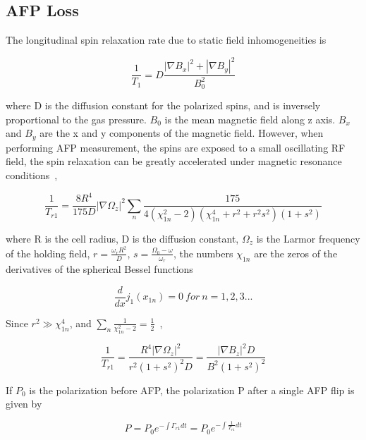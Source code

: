 \subsection{AFP Loss}

The longitudinal spin relaxation rate due to static field inhomogeneities is

\begin{equation}
\frac{1}{T_{1}} = D\frac{|\nabla B_{x}|^{2}+|\nabla B_{y}|^{2}}{B_{0}^{2}}
\end{equation}

where D is the diffusion constant for the polarized spins, and is inversely proportional to the gas pressure. $B_{0}$ is the mean magnetic field along z axis. $B_{x}$ and $B_{y}$ are the x and y components of the magnetic field. However, when performing AFP measurement, the spins are exposed to a small oscillating RF field, the spin relaxation can be greatly accelerated under magnetic resonance conditions~\cite{PhysRevA.38.5092},

\begin{equation}
\frac{1}{T_{r1}} = \frac{8R^{4}}{175D}|\nabla \Omega_{z}|^{2}\sum_{n} \frac{175}{4(\chi_{1n}^{2}-2)(\chi_{1n}^{4}+r^{2}+r^{2}s^{2})(1+s^{2})}
\end{equation}

where R is the cell radius, D is the diffusion constant, $\Omega_{z}$ is the Larmor frequency of the holding field, $r=\frac{\omega_{r}R^{2}}{D}$, $s=\frac{\Omega_{0}-\omega}{\omega_{r}}$, the numbers $\chi_{1n}$ are the zeros of the derivatives of the spherical Bessel functions

\begin{equation}
\frac{d}{dx}j_{1}(x_{1n})=0~for~n=1,2,3...
\end{equation}

Since $r^{2}\gg \chi_{1n}^{4}$, and $\sum_{n}\frac{1}{\chi_{1n}^{2}-2}=\frac{1}{2}$~\cite{PhysRevA.37.2877},

\begin{equation}
\frac{1}{T_{r1}}=\frac{R^{4}|\nabla\Omega_{z}|^{2}}{r^{2}(1+s^{2})^{2}D}=\frac{|\nabla B_{z}|^{2}D}{B^{2}(1+s^{2})^2}
\end{equation}

If $P_{0}$ is the polarization before AFP, the polarization P after a single AFP flip is given by 

\begin{equation}
P=P_{0}e^{-\int \Gamma_{r1} dt}=P_{0}e^{-\int \frac{1}{T_{r1}}dt}
\end{equation}


